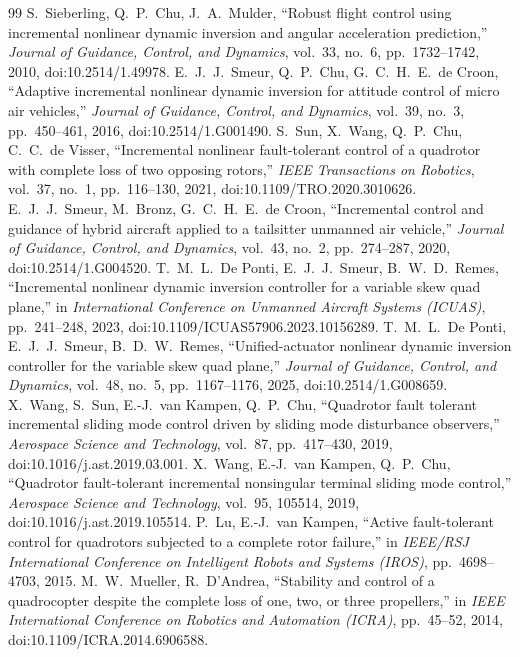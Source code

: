 \documentclass[preprint,12pt,a4paper]{elsarticle}
\begin{document}
\begin{thebibliography}{99}\small
{} S.~Sieberling, Q.~P.~Chu, J.~A.~Mulder, ``Robust flight control using incremental nonlinear dynamic inversion and angular acceleration prediction,'' \emph{Journal of Guidance, Control, and Dynamics}, vol.~33, no.~6, pp.~1732--1742, 2010, doi:10.2514/1.49978.
 E.~J.~J.~Smeur, Q.~P.~Chu, G.~C.~H.~E.~de Croon, ``Adaptive incremental nonlinear dynamic inversion for attitude control of micro air vehicles,'' \emph{Journal of Guidance, Control, and Dynamics}, vol.~39, no.~3, pp.~450--461, 2016, doi:10.2514/1.G001490.
 S.~Sun, X.~Wang, Q.~P.~Chu, C.~C.~de Visser, ``Incremental nonlinear fault-tolerant control of a quadrotor with complete loss of two opposing rotors,'' \emph{IEEE Transactions on Robotics}, vol.~37, no.~1, pp.~116--130, 2021, doi:10.1109/TRO.2020.3010626.
 E.~J.~J.~Smeur, M.~Bronz, G.~C.~H.~E.~de Croon, ``Incremental control and guidance of hybrid aircraft applied to a tailsitter unmanned air vehicle,'' \emph{Journal of Guidance, Control, and Dynamics}, vol.~43, no.~2, pp.~274--287, 2020, doi:10.2514/1.G004520.
 T.~M.~L.~De Ponti, E.~J.~J.~Smeur, B.~W.~D.~Remes, ``Incremental nonlinear dynamic inversion controller for a variable skew quad plane,'' in \emph{International Conference on Unmanned Aircraft Systems (ICUAS)}, pp.~241--248, 2023, doi:10.1109/ICUAS57906.2023.10156289.
 T.~M.~L.~De Ponti, E.~J.~J.~Smeur, B.~D.~W.~Remes, ``Unified-actuator nonlinear dynamic inversion controller for the variable skew quad plane,'' \emph{Journal of Guidance, Control, and Dynamics}, vol.~48, no.~5, pp.~1167--1176, 2025, doi:10.2514/1.G008659.
 X.~Wang, S.~Sun, E.-J.~van Kampen, Q.~P.~Chu, ``Quadrotor fault tolerant incremental sliding mode control driven by sliding mode disturbance observers,'' \emph{Aerospace Science and Technology}, vol.~87, pp.~417--430, 2019, doi:10.1016/j.ast.2019.03.001.
 X.~Wang, E.-J.~van Kampen, Q.~P.~Chu, ``Quadrotor fault-tolerant incremental nonsingular terminal sliding mode control,'' \emph{Aerospace Science and Technology}, vol.~95, 105514, 2019, doi:10.1016/j.ast.2019.105514.
 P.~Lu, E.-J.~van Kampen, ``Active fault-tolerant control for quadrotors subjected to a complete rotor failure,'' in \emph{IEEE/RSJ International Conference on Intelligent Robots and Systems (IROS)}, pp.~4698--4703, 2015.
 M.~W.~Mueller, R.~D'Andrea, ``Stability and control of a quadrocopter despite the complete loss of one, two, or three propellers,'' in \emph{IEEE International Conference on Robotics and Automation (ICRA)}, pp.~45--52, 2014, doi:10.1109/ICRA.2014.6906588.

\end{thebibliography}
\end{document}
